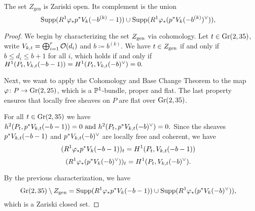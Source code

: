 



\begin{proposition}
	The set $Z_{\text{gen}}$ is Zariski open. Its complement is the union
	\[
		\operatorname{Supp}(R^1 \varphi_{*}p^{*} V_{k}(-b^{(k)}-1)) \cup
		\operatorname{Supp}(R^1 \varphi_{*}(p^{*} V_{k}(-b^{(k)})^\vee)),
	\]
\end{proposition}
\begin{proof}
	We begin by characterizing the set $Z_{\text{gen}}$ via cohomology. Let $t\in \operatorname{Gr}(2,35)$, write $V_{k,t}=\bigoplus_{i=1}^r \mathcal{O}(d_i)$ and $b\coloneqq b^{(k)}$. We have $t\in Z_{\text{gen}}$ if and only if $b\leq d_i \leq b+1$ for all $i$, which holds if and only if
	$
	H^1(P_t, V_{k,t}(-b-1))
	=
	H^1(P_t, V_{k,t}(-b)^\vee)
	=0.
	$

	Next, we want to apply the Cohomology and Base Change Theorem \cite[{}28.1.6]{vakil-algebraic-geometry} to the map 
	$\varphi \colon P \to \operatorname{Gr}(2,25)$, which is a $\mathbb{P}^1$-bundle, proper and flat. The last property ensures that locally free sheaves on $P$ are flat over $\operatorname{Gr}(2,35)$.

	For all $t\in \operatorname{Gr}(2,35)$ we have
	$
	h^2(P_t, p^{*}V_{k,t}(-b-1)) = 0
	\text{ and }
	h^2(P_t,p^{*}V_{k,t}(-b)^\vee)=0.
	$
	Since the sheaves $p^{*}V_{k,t}(-b-1)$ and $p^{*}V_{k,t}(-b)^\vee$ are locally free and coherent, we have 
	\[(R^1 \varphi_{*}p^{*} V_{k}(-b-1))_t = H^1(P_t,V_{k,t}(-b-1))\]
	\[
	(R^1 \varphi_{*}(p^{*} V_{k}(-b)^\vee))_t = H^1(P_t,V_{k,t}(-b)^\vee).
	\]

	By the previous characterization, we have
	\[
		\operatorname{Gr}(2,35) \setminus Z_{\text{gen}} =
		\operatorname{Supp}(R^1 \varphi_{*}p^{*} V_{k}(-b-1)) \cup
		\operatorname{Supp}(R^1 \varphi_{*}(p^{*} V_{k}(-b)^\vee)),
	\]
	which is a Zariski closed set.
\end{proof}

